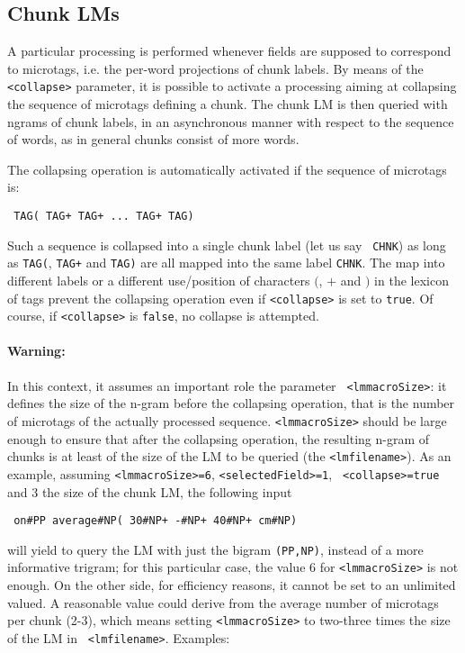 \subsection{Chunk LMs}

A particular processing is performed whenever fields are supposed to
correspond to microtags, i.e. the per-word projections of chunk labels. By
means of the {\tt <collapse>} parameter, it is possible to activate a
processing aiming at collapsing the sequence of microtags defining a
chunk. The chunk LM is then queried with ngrams of chunk labels, in an
asynchronous manner with respect to the sequence of words, as in general
chunks consist of more words.

\noindent
The collapsing operation is automatically activated if the sequence of
microtags is:

\begin{verbatim}
 TAG( TAG+ TAG+ ... TAG+ TAG)
\end{verbatim}

\noindent
Such a sequence is collapsed into a single chunk label (let us say {\tt
CHNK}) as long as {\tt TAG(}, {\tt TAG+} and {\tt TAG)} are all mapped into
the same label {\tt CHNK}. The map into different labels or a different
use/position of characters $($, $+$ and $)$ in the lexicon of tags prevent
the collapsing operation even if {\tt <collapse>} is set to {\tt true}. Of
course, if {\tt <collapse>} is {\tt false}, no collapse is attempted.

\paragraph{Warning:} In this context, it assumes an important role the parameter {\tt
<lmmacroSize>}: it defines the size of the n-gram before the collapsing
operation, that is the number of microtags of the actually processed
sequence. {\tt <lmmacroSize>} should be large enough to ensure that after
the collapsing operation, the resulting n-gram of chunks is at least of the
size of the LM to be queried (the {\tt <lmfilename>}). As an example,
assuming {\tt <lmmacroSize>=6}, {\tt <selectedField>=1}, {\tt
<collapse>=true} and 3 the size of the chunk LM, the following input

\begin{verbatim}
 on#PP average#NP( 30#NP+ -#NP+ 40#NP+ cm#NP)
\end{verbatim}

\noindent will yield to query the LM with just the bigram {\tt (PP,NP)},
instead of a more informative trigram; for this particular case, the value
6 for {\tt <lmmacroSize>} is not enough.  On the other side, for efficiency
reasons, it cannot be set to an unlimited valued. A reasonable value could
derive from the average number of microtags per chunk (2-3), which means
setting {\tt <lmmacroSize>} to two-three times the size of the LM in {\tt
<lmfilename>}.  Examples:
\bigskip

